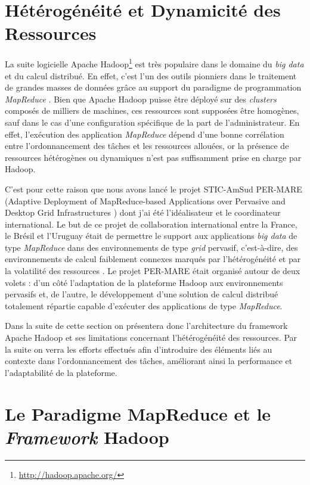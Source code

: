\section{Hétérogénéité et Dynamicité des Ressources} \label{sec:Guilherme}

La suite logicielle Apache Hadoop\footnote{\url{http://hadoop.apache.org/}} est très populaire dans le domaine du \textit{big data} et du calcul distribué. En effet, c'est l'un des outils pionniers dans le traitement de grandes masses de données grâce au support du paradigme de programmation \textit{MapReduce} \cite{Dean2008}. Bien que Apache Hadoop puisse être déployé sur des \textit{clusters} composés de milliers de machines, ces ressources sont supposées être homogènes, sauf dans le cas d'une configuration spécifique de la part de l'administrateur. En effet, l'exécution des application \textit{MapReduce} dépend d'une bonne corrélation entre l'ordonnancement des tâches et les ressources allouées, or la présence de ressources hétérogènes ou dynamiques n'est pas suffisamment prise en charge par Hadoop. 

C'est pour cette raison que nous avons lancé le projet STIC-AmSud PER-MARE (Adaptive Deployment of MapReduce-based Applications over Pervasive and Desktop Grid Infrastructures \cite{PER-MARE}) dont j'ai été l'idéalisateur et le coordinateur international. Le but de ce projet de collaboration international entre la France, le Brésil et l'Uruguay était de permettre le support aux applications \textit{big data} de type \textit{MapReduce} dans des environnements de type \textit{grid} pervasif, c'est-à-dire, des environnements de calcul faiblement connexes marqués par l'hétérogénéité et par la volatilité des ressources \cite{3PGCIC}. Le projet PER-MARE était organisé autour de deux volets : d'un côté l'adaptation de la plateforme Hadoop aux environnements pervasifs et, de l'autre, le développement d'une solution de calcul distribué totalement répartie capable d'exécuter des applications de type \textit{MapReduce}.
 
Dans la suite de cette section on présentera donc l'architecture du framework Apache Hadoop et ses limitations concernant l'hétérogénéité des ressources. Par la suite on verra les efforts effectués afin d'introduire des éléments liés au contexte dans l'ordonnancement des tâches, améliorant ainsi la performance et l'adaptabilité de la plateforme. 

\section{Le Paradigme MapReduce et le \textit{Framework} Hadoop}

